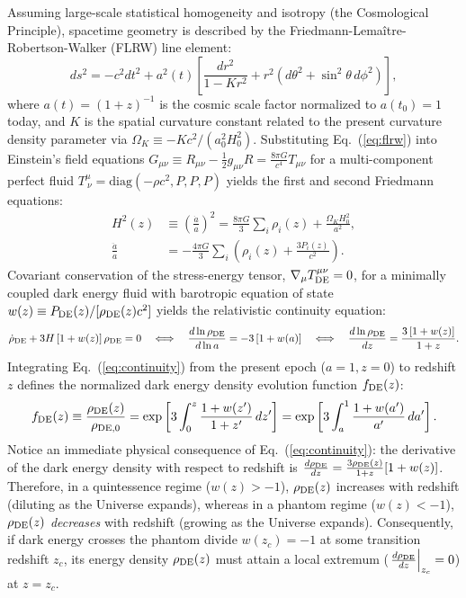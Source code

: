 \documentclass[11pt,letterpaper]{article}
\begin{document}
Assuming large-scale statistical homogeneity and isotropy (the Cosmological Principle), spacetime geometry is described by the Friedmann-Lema\^{i}tre-Robertson-Walker (FLRW) line element:
\begin{equation}
    ds^2 = -c^2 dt^2 + a^2(t) \left[ \frac{dr^2}{1 - K r^2} + r^2 \left( d\theta^2 + \sin^2\theta\, d\phi^2 \right) \right],
    \label{eq:flrw}
\end{equation}
where $a(t) = (1+z)^{-1}$ is the cosmic scale factor normalized to $a(t_0) = 1$ today, and $K$ is the spatial curvature constant related to the present curvature density parameter via $\Omega_K \equiv -K c^2 / (a_0^2 H_0^2)$. Substituting Eq.~(\ref{eq:flrw}) into Einstein's field equations $G_{\mu\nu} \equiv R_{\mu\nu} - \frac{1}{2}g_{\mu\nu}R = \frac{8\pi G}{c^4} T_{\mu\nu}$ for a multi-component perfect fluid $T^\mu_{\ \nu} = \text{diag}(-\rho c^2, P, P, P)$ yields the first and second Friedmann equations:
\begin{align}
    H^2(z) &\equiv \left(\frac{\dot{a}}{a}\right)^2 = \frac{8\pi G}{3} \sum_i \rho_i(z) + \frac{\Omega_K H_0^2}{a^2}, \label{eq:friedmann1} \\
    \frac{\ddot{a}}{a} &= -\frac{4\pi G}{3} \sum_i \left( \rho_i(z) + \frac{3 P_i(z)}{c^2} \right). \label{eq:friedmann2}
\end{align}
Covariant conservation of the stress-energy tensor, $\nabla_\mu T^{\mu\nu}_{\rm DE} = 0$, for a minimally coupled dark energy fluid with barotropic equation of state $w(z) \equiv P_{\rm DE}(z) / [\rho_{\rm DE}(z) c^2]$ yields the relativistic continuity equation:
\begin{equation}
    \dot{\rho}_{\rm DE} + 3H \left[ 1 + w(z) \right] \rho_{\rm DE} = 0 \quad \Longleftrightarrow \quad \frac{d \ln \rho_{\rm DE}}{d \ln a} = -3 \left[ 1 + w(a) \right] \quad \Longleftrightarrow \quad \frac{d \ln \rho_{\rm DE}}{dz} = \frac{3\left[1 + w(z)\right]}{1 + z}.
    \label{eq:continuity}
\end{equation}
Integrating Eq.~(\ref{eq:continuity}) from the present epoch ($a=1, z=0$) to redshift $z$ defines the normalized dark energy density evolution function $f_{\rm DE}(z)$:
\begin{equation}
    f_{\rm DE}(z) \equiv \frac{\rho_{\rm DE}(z)}{\rho_{\rm DE,0}} = \exp \left[ 3 \int_0^z \frac{1 + w(z')}{1 + z'}\, dz' \right] = \exp \left[ 3 \int_a^1 \frac{1 + w(a')}{a'}\, da' \right].
    \label{eq:fde_general}
\end{equation}
Notice an immediate physical consequence of Eq.~(\ref{eq:continuity}): the derivative of the dark energy density with respect to redshift is $\frac{d\rho_{\rm DE}}{dz} = \frac{3\rho_{\rm DE}(z)}{1+z}[1 + w(z)]$. Therefore, in a quintessence regime ($w(z) > -1$), $\rho_{\rm DE}(z)$ increases with redshift (diluting as the Universe expands), whereas in a phantom regime ($w(z) < -1$), $\rho_{\rm DE}(z)$ \emph{decreases} with redshift (growing as the Universe expands). Consequently, if dark energy crosses the phantom divide $w(z_c) = -1$ at some transition redshift $z_c$, its energy density $\rho_{\rm DE}(z)$ must attain a local extremum ($\left.\frac{d\rho_{\rm DE}}{dz}\right|_{z_c} = 0$) at $z = z_c$.
\end{document}
